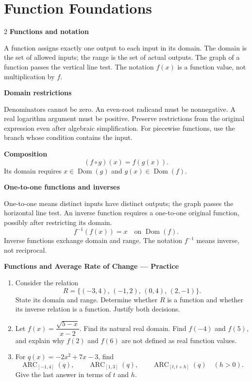 \documentclass[11pt]{article}
\begin{document}
\section*{Function Foundations}
\begin{multicols}{2}
\small
\textbf{Functions and notation}

A function assigns exactly one output to each input in its domain.
The domain is the set of allowed inputs; the range is the set of actual outputs.
The graph of a function passes the vertical line test. The notation $f(x)$
is a function value, not multiplication by $f$.

\medskip
\textbf{Domain restrictions}

Denominators cannot be zero. An even-root radicand must be nonnegative.
A real logarithm argument must be positive. Preserve restrictions from the
original expression even after algebraic simplification. For piecewise
functions, use the branch whose condition contains the input.

\columnbreak
\textbf{Composition}
\[
  (f\circ g)(x)=f(g(x)).
\]
Its domain requires $x\in\operatorname{Dom}(g)$ and
$g(x)\in\operatorname{Dom}(f)$.

\medskip
\textbf{One-to-one functions and inverses}

One-to-one means distinct inputs have distinct outputs; the graph passes the
horizontal line test. An inverse function requires a one-to-one original
function, possibly after restricting its domain.
\[
  f^{-1}(f(x))=x\quad\text{on }\operatorname{Dom}(f).
\]
Inverse functions exchange domain and range. The notation $f^{-1}$ means
inverse, not reciprocal.
\end{multicols}

\newpage
\begin{center}
  {\large\textbf{Functions and Average Rate of Change --- Practice}}
\end{center}

\begin{enumerate}[leftmargin=*,itemsep=0pt]
  \item Consider the relation
  \[
    R=\{(-3,4),\,(-1,2),\,(0,4),\,(2,-1)\}.
  \]
  State its domain and range. Determine whether $R$ is a function and
  whether its inverse relation is a function. Justify both decisions.

  \item Let $f(x)=\dfrac{\sqrt{5-x}}{x-2}$. Find its natural real domain.
  Find $f(-4)$ and $f(5)$, and explain why $f(2)$ and $f(6)$ are not defined
  as real function values.

  \item For $q(x)=-2x^2+7x-3$, find
  \[
    \operatorname{ARC}_{[-1,4]}(q),\qquad
    \operatorname{ARC}_{[1,3]}(q),\qquad
    \operatorname{ARC}_{[t,t+h]}(q)\quad(h>0).
  \]
  Give the last answer in terms of $t$ and $h$.
\end{enumerate}
\end{document}
